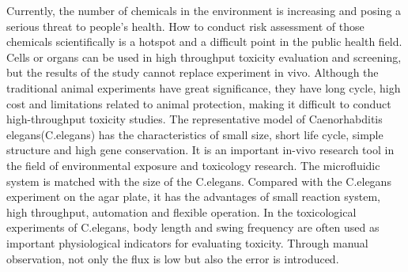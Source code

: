 \begin{englishabstract}
	Currently, the number of chemicals in the environment is increasing and posing a serious threat to people's health. 
	How to conduct risk assessment of those chemicals scientifically is a hotspot and a difficult point in the public health field.
	Cells or organs can be used  in  high throughput toxicity evaluation and screening,
	but the results of the study cannot replace experiment in vivo.
	Although the traditional animal experiments have great significance, 
they have long cycle, high cost and limitations related to animal protection, 
making it difficult to conduct high-throughput toxicity studies.
The representative model of  Caenorhabditis elegans(C.elegans) has the characteristics of small size, short life cycle, simple structure and high gene conservation. 
It is an important in-vivo research tool in the field of environmental exposure and toxicology research.
The microfluidic system is matched with the size of the C.elegans. 
Compared with the C.elegans experiment on the agar plate, 
it has the advantages of small reaction system, 
high throughput, automation and flexible operation.
In the toxicological experiments of C.elegans, 
body length and swing frequency are often used as important physiological indicators 
for evaluating toxicity. Through manual observation, not only the flux is low but also the error is introduced.


\end{englishabstract}

